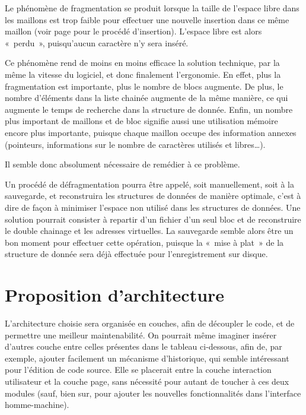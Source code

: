 Le phénomène de fragmentation se produit lorsque la taille de l'espace libre
dans les maillons est trop faible pour effectuer une nouvelle insertion dans ce
même maillon (voir page \pageref{sec:structurationligne} pour le procédé
d'insertion). L'espace libre est alors «~perdu~», puisqu'aucun caractère n'y
sera inséré.

Ce phénomène rend de moins en moins efficace la solution technique, par la
même la vitesse du logiciel, et donc finalement l'ergonomie. En effet,
plus la fragmentation est importante, plus le nombre de blocs augmente. De plus,
le nombre d'éléments dans la liste chainée augmente de la même manière, ce
qui augmente le temps de recherche dans la structure de donnée.
Enfin, un nombre plus important de maillons et de bloc signifie aussi une
utilisation mémoire encore plus importante, puisque chaque maillon occupe des
information annexes (pointeurs, informations sur le nombre de caractères
utilisés et libres\ldots).

Il semble donc absolument nécessaire de remédier à ce problème.

Un procédé de défragmentation pourra être appelé, soit manuellement, soit à la
sauvegarde, et reconstruira les structures de données de manière optimale, c'est
à dire de façon à minimiser l'espace non utilisé dans les structures de données.
Une solution pourrait consister à repartir d'un fichier d'un seul bloc et de
reconstruire le double chainage et les adresses virtuelles. La sauvegarde semble
alors être un bon moment pour effectuer cette opération, puisque la «~mise à
plat~» de la structure de donnée sera déjà effectuée pour l'enregistrement sur
disque.



\section{Proposition d'architecture}
L'architecture choisie sera organisée en couches, afin de découpler le code, et de
permettre une meilleur maintenabilité. On pourrait même imaginer insérer
d'autres couche entre celles présentes dans le tableau ci-dessous, afin de, par
exemple, ajouter facilement un mécanisme d'historique, qui semble intéressant
pour l'édition de code source. Elle se placerait entre la couche interaction
utilisateur et la couche page, sans nécessité pour autant de toucher à ces deux
modules (sauf, bien sur, pour ajouter les nouvelles fonctionnalités dans
l'interface homme-machine).

